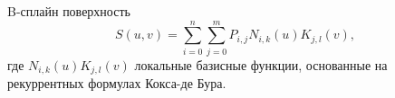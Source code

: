 \documentclass{beamer}
\begin{document}
	\begin{frame}{B-сплайн поверхность}
		\[
			S(u,v) = \sum_{i=0}^{n}\sum_{j=0}^{m} P_{i,j} N_{i,k}(u) K_{j,l}(v)
		,
		\]
		где $N_{i,k}(u) K_{j,l}(v)$ локальные базисные функции, основанные на рекуррентных формулах Кокса-де Бура.


	\end{frame}

	
\end{document}
